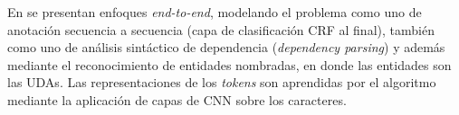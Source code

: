 \documentclass[a4paper,11pt,twocolumn,twoside]{article}
\begin{document}
En \cite{eger2017neural} se presentan enfoques \textit{end-to-end}, modelando el problema como
uno de anotación secuencia a secuencia (capa de clasificación CRF al final), también
como uno de análisis sintáctico de dependencia (\textit{dependency parsing}) \cite{kiperwasser2016simple}
y además mediante el reconocimiento de entidades nombradas, en donde las entidades son las UDAs.
Las representaciones de los \textit{tokens} son aprendidas por el algoritmo mediante la 
aplicación de capas de CNN sobre los caracteres.


\end{document}
